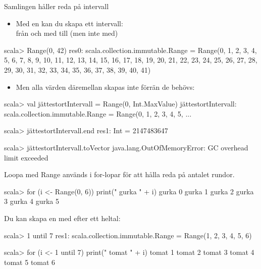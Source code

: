 \begin{Slide}{Samlingen  håller reda på intervall}
\begin{itemize}
\item Med en  kan du skapa ett intervall: \\ från och med  till (men inte med) 
\end{itemize}

\begin{REPLnonum}
scala> Range(0, 42)
res0: scala.collection.immutable.Range = 
  Range(0, 1, 2, 3, 4, 5, 6, 7, 8, 9, 10, 11, 12, 13, 14, 
    15, 16, 17, 18, 19, 20, 21, 22, 23, 24, 25, 26, 27, 28, 
    29, 30, 31, 32, 33, 34, 35, 36, 37, 38, 39, 40, 41)
\end{REPLnonum}

\begin{itemize}
\item Men alla värden däremellan skapas inte förrän de behövs:
\end{itemize}

\begin{REPL}
scala> val jättestortIntervall = Range(0, Int.MaxValue)
jättestortIntervall: scala.collection.immutable.Range = Range(0, 1, 2, 3, 4, 5, ...

scala> jättestortIntervall.end
res1: Int = 2147483647

scala> jättestortIntervall.toVector
java.lang.OutOfMemoryError: GC overhead limit exceeded
\end{REPL}

\end{Slide}

\begin{Slide}{Loopa med Range}
 används i for-lopar för att hålla reda på antalet rundor.
\begin{REPLnonum}
scala> for (i <- Range(0, 6)) print(" gurka " + i)
 gurka 0 gurka 1 gurka 2 gurka 3 gurka 4 gurka 5 
\end{REPLnonum}
Du kan skapa en  med  efter ett heltal:
\begin{REPLnonum}
scala> 1 until 7
res1: scala.collection.immutable.Range = 
  Range(1, 2, 3, 4, 5, 6)

scala> for (i <- 1 until 7) print(" tomat " + i) 
 tomat 1 tomat 2 tomat 3 tomat 4 tomat 5 tomat 6

\end{REPLnonum}
\end{Slide}

